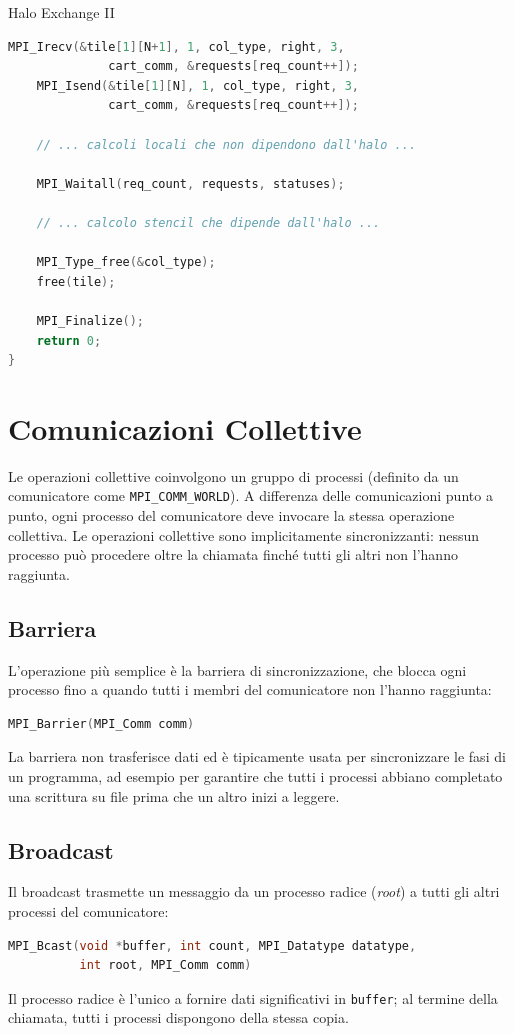 \begin{example}{Halo Exchange II}
\begin{lstlisting}[language=C]
    MPI_Irecv(&tile[1][N+1], 1, col_type, right, 3,
              cart_comm, &requests[req_count++]);
    MPI_Isend(&tile[1][N], 1, col_type, right, 3,
              cart_comm, &requests[req_count++]);

    // ... calcoli locali che non dipendono dall'halo ...

    MPI_Waitall(req_count, requests, statuses);

    // ... calcolo stencil che dipende dall'halo ...

    MPI_Type_free(&col_type);
    free(tile);

    MPI_Finalize();
    return 0;
}
    \end{lstlisting}
\end{example}

\section{Comunicazioni Collettive}
Le operazioni collettive coinvolgono un gruppo di processi (definito da un comunicatore come \texttt{MPI\_COMM\_WORLD}).
A differenza delle comunicazioni punto a punto, ogni processo del comunicatore deve invocare la stessa operazione collettiva. Le operazioni collettive sono implicitamente sincronizzanti: nessun processo può procedere oltre la chiamata finché tutti gli altri non l'hanno raggiunta.

\subsection{Barriera}
L'operazione più semplice è la barriera di sincronizzazione, che blocca ogni processo fino a quando tutti i membri del comunicatore non l'hanno raggiunta:
\begin{lstlisting}[language=C, numbers=none]
MPI_Barrier(MPI_Comm comm)
\end{lstlisting}
La barriera non trasferisce dati ed è tipicamente usata per sincronizzare le fasi di un programma, ad esempio per garantire che tutti i processi abbiano completato una scrittura su file prima che un altro inizi a leggere.

\subsection{Broadcast}
Il broadcast trasmette un messaggio da un processo radice (\emph{root}) a tutti gli altri processi del comunicatore:
\begin{lstlisting}[language=C, numbers=none]
MPI_Bcast(void *buffer, int count, MPI_Datatype datatype,
          int root, MPI_Comm comm)
\end{lstlisting}
Il processo radice è l'unico a fornire dati significativi in \texttt{buffer}; al termine della chiamata, tutti i processi dispongono della stessa copia.

